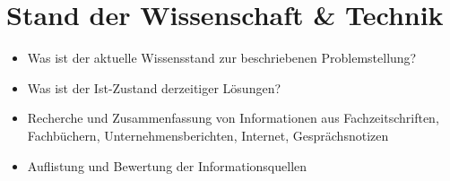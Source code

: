 \section{Stand der Wissenschaft \& Technik}
\label{sec:Stand}
\begin{itemize}
  \item Was ist der aktuelle Wissensstand zur beschriebenen Problemstellung?
  \item Was ist der Ist-Zustand derzeitiger Lösungen?
  \item Recherche und Zusammenfassung von Informationen aus Fachzeitschriften, Fachbüchern, Unternehmensberichten, Internet, Gesprächsnotizen
  \item Auflistung und Bewertung der Informationsquellen
\end{itemize}